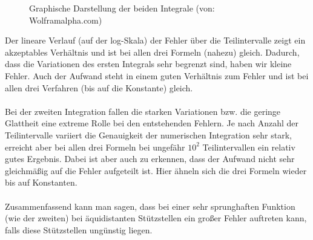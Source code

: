 \documentclass[11pt,a4paper,ngerman]{article}
\begin{document}
\begin{description}
\begin{figure}[ht]
\centering
{}
\caption{Graphische Darstellung der beiden Integrale (von: Wolframalpha.com)}
\end{figure}
\end{description}
Der lineare Verlauf (auf der log-Skala) der Fehler über die Teilintervalle zeigt ein akzeptables Verhältnis und ist bei allen drei Formeln (nahezu) gleich. Dadurch, dass die Variationen des ersten Integrals sehr begrenzt sind, haben wir kleine Fehler. Auch der Aufwand steht in einem guten Verhältnis zum Fehler und ist bei allen drei Verfahren (bis auf die Konstante) gleich.
\\
\\
Bei der zweiten Integration fallen die starken Variationen bzw. die geringe Glattheit eine extreme Rolle bei den entstehenden Fehlern. Je nach Anzahl der Teilintervalle variiert die Genauigkeit der numerischen Integration sehr stark, erreicht aber bei allen drei Formeln bei ungefähr $10^2$ Teilintervallen ein relativ gutes Ergebnis. Dabei ist aber auch zu erkennen, dass der Aufwand nicht sehr gleichmäßig auf die Fehler aufgeteilt ist. Hier ähneln sich die drei Formeln wieder bis auf Konstanten.
\\
\\
Zusammenfassend kann man sagen, dass bei einer sehr sprunghaften Funktion (wie der zweiten) bei äquidistanten Stützstellen ein großer Fehler auftreten kann, falls diese Stützstellen ungünstig liegen. 


\label{LastPage}
\end{document}
